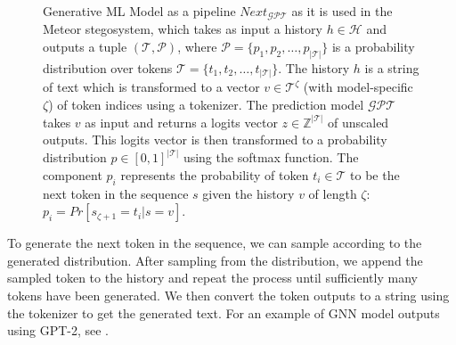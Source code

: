 \begin{figure}[htpb]
  \centering
  \caption{
Generative ML Model as a pipeline $Next_{\mathcal{GPT}}$ as it is used in the Meteor stegosystem, which takes as input a history $h \in \mathcal{H}$ and outputs a tuple $(\mathcal{T}, \mathcal{P})$, where $\mathcal{P} = \{p_1, p_2, \dots, p_{|\mathcal{T}|}\}$ is a probability distribution over tokens $\mathcal{T} = \{ t_1, t_2, \dots, t_{|\mathcal{T}|}\}$. 
The history $h$ is a string of text which is transformed to a vector $v \in \mathcal{T}^\zeta$ (with model-specific $\zeta$) of token indices using a tokenizer.
The prediction model $\mathcal{GPT}$ takes $v$ as input and returns a logits vector $z \in \mathbb{Z}^{|\mathcal{T}|}$ of unscaled outputs.
This logits vector is then transformed to a probability distribution $p \in [0,1]^{|\mathcal{T}|}$ using the softmax function.
  The component $p_i$ represents the probability of token $t_i \in \mathcal{T}$ to be the next token in the sequence $s$ given the history $v$ of length $\zeta$: $p_i = Pr[s_{\zeta+1}=t_i|s=v]$.
}
  \label{fig:generative-network}
\end{figure}

To generate the next token in the sequence, we can sample according to the generated distribution.
After sampling from the distribution, we append the sampled token to the history and repeat the process until sufficiently many tokens have been generated.
We then convert the token outputs to a string using the tokenizer to get the generated text.
For an example of GNN model outputs using GPT-2, see .

